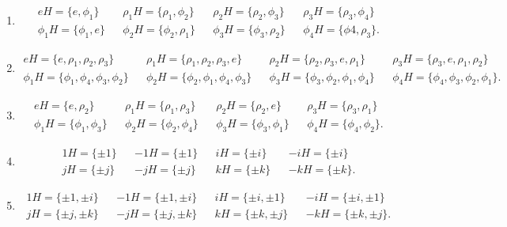 \documentclass{homework}
\begin{document}
\begin{solution}
  \begin{enumerate}[label=(\alph*)]
    \item
      \begin{align*}
        eH=\{ e,\phi_1 \}&&\rho_1H=\{ \rho_1,\phi_2 \}&&\rho_2H=\{ \rho_2,\phi_3 \}&&\rho_3H=\{
        \rho_3,\phi_4 \}\\
          \phi_1H=\{ \phi_1,e \}&&\phi_2H=\{ \phi_2,\rho_1 \}&&\phi_3H=\{ \phi_3,\rho_2
          \}&&\phi_4H=\{ \phi4,\rho_3 \}
      .\end{align*}
    \item
      \begin{align*}
        eH=\{ e,\rho_1,\rho_2,\rho_3 \}&&\rho_1H=\{ \rho_1,\rho_2,\rho_3,e \}&&\rho_2H=\{
        \rho_2,\rho_3,e,\rho_1 \}&&\rho_3H=\{ \rho_3,e,\rho_1,\rho_2 \}\\
        \phi_1H=\{ \phi_1,\phi_4,\phi_3,\phi_2 \}&&\phi_2H=\{ \phi_2,\phi_1,\phi_4,\phi_3
        \}&&\phi_3H=\{ \phi_3,\phi_2,\phi_1,\phi_4 \}&&\phi_4H=\{ \phi_4,\phi_3,\phi_2,\phi_1 \}
      .\end{align*}
    \item
      \begin{align*}
        eH=\{ e,\rho_2 \}&&\rho_1H=\{ \rho_1,\rho_3 \}&&\rho_2H=\{ \rho_2,e \}&&\rho_3H=\{
        \rho_3,\rho_1 \}\\
          \phi_1H=\{ \phi_1,\phi_3\}&&\phi_2H=\{ \phi_2,\phi_4 \}&&\phi_3H=\{ \phi_3,\phi_1 \}
                                    &&\phi_4H=\{ \phi_4,\phi_2 \}
      .\end{align*}
    \item
      \begin{align*}
        1H=\{ \pm 1 \}&&-1H=\{ \pm 1 \}&&iH=\{ \pm i \}&&-iH=\{ \pm i \}\\
        jH=\{ \pm j \}&&-jH=\{ \pm j \}&&kH=\{ \pm k \}&&-kH=\{ \pm k \}
      .\end{align*}
    \item
      \begin{align*}
        1H=\{ \pm 1,\pm i \}&&-1H=\{ \pm 1,\pm i \}&&iH=\{ \pm i,\pm 1 \}&&-iH=\{ \pm i,\pm 1 \}\\
        jH=\{ \pm j,\pm k \}&&-jH=\{ \pm j,\pm k \}&&kH=\{ \pm k,\pm j \}&&-kH=\{ \pm k,\pm j \}
      .\end{align*}
  \end{enumerate}
\end{solution}
\end{document}
